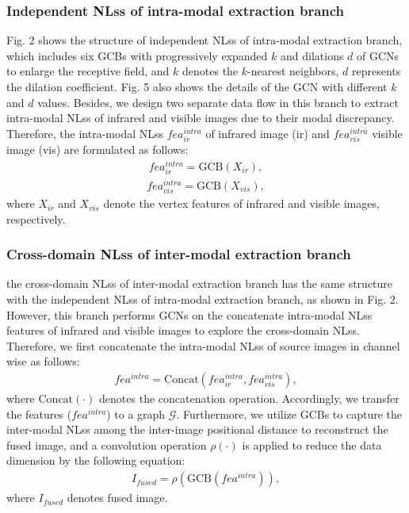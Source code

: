 \documentclass[journal]{IEEEtran}
\begin{document}
\subsubsection{Independent NLss of intra-modal extraction branch}
Fig. 2 shows the structure of independent NLss of intra-modal extraction branch, which includes six GCBs with progressively expanded $k$ and dilations $d$ of GCNs to enlarge the receptive field, and $k$ denotes the $k$-nearest neighbors, $d$ represents the dilation coefficient. Fig. 5 also shows the details of the GCN with different $k$ and $d$ values. Besides, we design two separate data flow in this branch to extract intra-modal NLss of infrared and visible images due to their modal discrepancy. Therefore, the intra-modal NLss  $fea_{ir}^{intra}$ of infrared image (ir) and $fea_{vis}^{intra}$ visible image (vis) are formulated as follows:
\begin{equation}
\begin{split}
fea_{ir}^{intra}=\text{GCB}\left( {{X}_{ir}} \right),
\end{split}
\end{equation}
\begin{equation}
\begin{split}
fea_{vis}^{intra}=\text{GCB}\left( {{X}_{vis}} \right),
\end{split}
\end{equation}
where ${{X}_{ir}}$ and ${{X}_{vis}}$ denote the vertex features of infrared and visible images, respectively.


\subsubsection{Cross-domain NLss of inter-modal extraction branch}
the cross-domain NLss of inter-modal extraction branch has the same structure with the independent NLss of intra-modal extraction branch, as shown in Fig. 2. However, this  branch performs GCNs on the concatenate intra-modal NLss features of infrared and visible images to explore the cross-domain NLss. Therefore, we first concatenate the intra-modal NLss of source images in channel wise as follows:
\begin{equation}
\begin{split}
fea^{intra}=\text{Concat}\left( fea_{ir}^{intra} ,fea_{vis}^{intra} \right),
\end{split}
\end{equation}
where $\text{Concat}(\cdot )$ denotes the concatenation operation. Accordingly, we transfer the features ($fea^{intra}$) to a graph $\mathcal{G}$. Furthermore, we utilize GCBs to capture the inter-modal NLss among the inter-image positional distance to reconstruct the fused image, and a convolution operation $\rho \left( \cdot  \right)$ is applied to reduce the data dimension by the following equation:
\begin{equation}
\begin{split}
{{I}_{fused}}=\rho \left( \text{GCB}\left( fea^{intra} \right) \right),
\end{split}
\end{equation}
where ${{I}_{fused}}$ denotes fused image.
\end{document}
